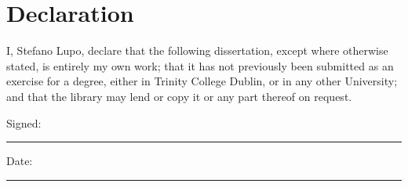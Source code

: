 \chapter*{Declaration}

I, Stefano Lupo, declare that the following dissertation, except where otherwise stated, is entirely my own work; that it has not previously been submitted as an exercise for a degree, either in Trinity College Dublin, or in any other University; and that the library may lend or copy it or any part thereof on request.

\vspace{3cm}

Signed:~\rule{5cm}{0.3pt}\hfill Date:~\rule{5cm}{0.3pt}
\newpage